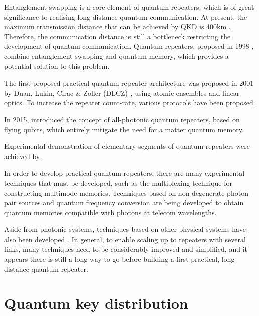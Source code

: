 Entanglement swapping is a core element of quantum repeaters, which is of great significance to realising long-distance quantum communication. At present, the maximum transmission distance that can be achieved by QKD is 400km \cite{bib:arxiv_1606.06821}. Therefore, the communication distance is still a bottleneck restricting the development of quantum communication. Quantum repeaters, proposed in 1998 \cite{bib:BDCZ98}, combine entanglement swapping and quantum memory, which provides a potential solution to this problem.

The first proposed practical quantum repeater architecture was proposed in 2001 by Duan, Lukin, Cirac \& Zoller (DLCZ) \cite{bib:Duan01}, using atomic ensembles and linear optics. To increase the repeater count-rate, various protocols \cite{bib:RMP_83_33, bib:PRA_79_042340, bib:PRA_92_012307, bib:PRA_81_052311, bib:PRA_81_052329, bib:NP_6_777, bib:MKLLJ14} have been proposed.

In 2015, \cite{bib:ncomms7787} introduced the concept of all-photonic quantum repeaters, based on flying qubits, which entirely mitigate the need for a matter quantum memory. 

Experimental demonstration of elementary segments of quantum repeaters were achieved by \cite{bib:Sc_316_1316, bib:Nature_454_1098}.

In order to develop practical quantum repeaters, there are many experimental techniques that must be developed, such as the multiplexing technique \cite{bib:PRA_76_050301, bib:PRA_82_010304, bib:PRL_113_053603, bib:PRL_98_060502} for constructing multimode memories. Techniques based on non-degenerate photon-pair sources \cite{bib:Nat_469_508, bib:Nat_469_512, bib:PRL_112_040504, bib:PRA_92_012329} and quantum frequency conversion \cite{bib:NP_6_894, bib:NC_5_3376} are being developed to obtain quantum memories compatible with photons at telecom wavelengths.

Aside from photonic systems, techniques based on other physical systems have also been developed \cite{bib:NP_11_37, bib:Sc_337_72, bib:N_484_195, bib:bernien2013heralded}. In general, to enable scaling up to repeaters with several links, many techniques need to be considerably improved and simplified, and it appears there is still a long way to go before building a first practical, long-distance quantum repeater.

%
%

\section{Quantum key distribution} \label{bib:QKD_state_of_art}

